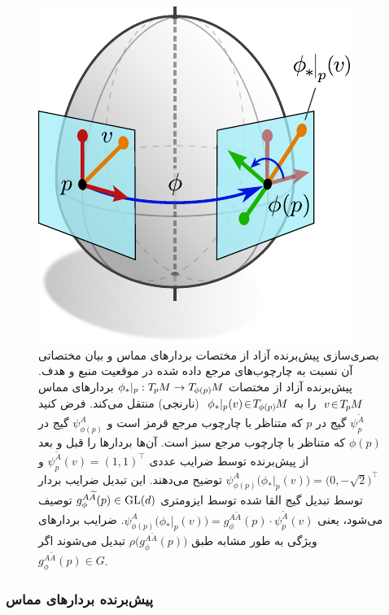 \begin{figure}
	\centering
	\hspace{.5ex}
	\includegraphics[width=.35\textwidth]{figures/isometry_egg_tangent_vector_gauge_trafo.pdf}
	\caption[]{\small
		بصری‌سازی پیش‌برنده آزاد از مختصات بردارهای مماس و بیان مختصاتی آن نسبت به چارچوب‌های مرجع داده شده در موقعیت منبع و هدف.
		پیش‌برنده آزاد از مختصات ${\phi_*|_p: T_{\mkern-1.5mu p}\mkern-.5muM \to T_{\mkern-1.5mu \phi(p)}\mkern-1muM}$ بردارهای مماس $\ v \!\in\! T_{\mkern-1.5mu p}\mkern-.5muM\ $ را به $\ \phi_*|_p(v) \!\in\! T_{\mkern-1.5mu \phi(p)}\mkern-1muM\,$ (نارنجی) منتقل می‌کند.
		فرض کنید $\psi_p^{\widetilde{A}}$ گیج در $p$ که متناظر با چارچوب مرجع قرمز است و $\psi_{\phi(p)}^A$ گیج در $\phi(p)$ که متناظر با چارچوب مرجع سبز است.
		آن‌ها بردارها را قبل و بعد از پیش‌برنده توسط ضرایب عددی $\psi_p^{\widetilde{A}}(v) = (1,1)^\top$ و $\psi_{\phi(p)}^A \big( \phi_*|_p(v) \big) = \big(0,-\sqrt{2}\big)^\top$ توضیح می‌دهند.
		این تبدیل ضرایب بردار توسط تبدیل گیج القا شده توسط ایزومتری $g_\phi^{A\widetilde{A}}(p) \in \operatorname{GL}(d)$ توصیف می‌شود، یعنی
		$\psi_{\phi(p)}^A \big( \phi_*|_p(v) \big) = g_\phi^{A\widetilde{A}}(p) \cdot \psi_p^{\widetilde{A}}(v)$.
		ضرایب بردارهای ویژگی به طور مشابه طبق $\rho\big( g_\phi^{A\widetilde{A}}(p) \big)$ تبدیل می‌شوند اگر $g_\phi^{A\widetilde{A}}(p) \in G$.
		\\[1ex]
	}
	\label{fig:pushforward_vector_components}
\end{figure}





\subsubsection{پیش‌برنده بردارهای مماس}

